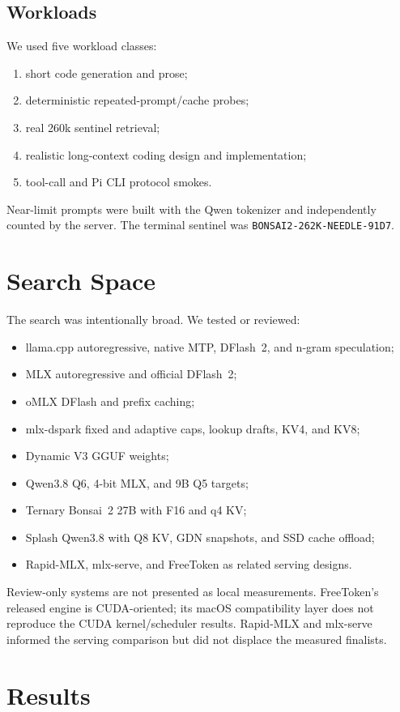 \documentclass[11pt]{article}
\begin{document}
\subsection{Workloads}
We used five workload classes:
\begin{enumerate}[leftmargin=1.6em]
\item short code generation and prose;
\item deterministic repeated-prompt/cache probes;
\item real 260k sentinel retrieval;
\item realistic long-context coding design and implementation;
\item tool-call and Pi CLI protocol smokes.
\end{enumerate}
Near-limit prompts were built with the Qwen tokenizer and independently counted by the server. The terminal sentinel was \texttt{BONSAI2-262K-NEEDLE-91D7}.

\section{Search Space}
The search was intentionally broad. We tested or reviewed:
\begin{itemize}[leftmargin=1.6em]
\item llama.cpp autoregressive, native MTP, DFlash~2, and n-gram speculation;
\item MLX autoregressive and official DFlash~2;
\item oMLX DFlash and prefix caching;
\item mlx-dspark fixed and adaptive caps, lookup drafts, KV4, and KV8;
\item Dynamic V3 GGUF weights;
\item Qwen3.8 Q6, 4-bit MLX, and 9B Q5 targets;
\item Ternary Bonsai~2 27B with F16 and q4 KV;
\item Splash Qwen3.8 with Q8 KV, GDN snapshots, and SSD cache offload;
\item Rapid-MLX, mlx-serve, and FreeToken as related serving designs.
\end{itemize}
Review-only systems are not presented as local measurements. FreeToken's released engine is CUDA-oriented; its macOS compatibility layer does not reproduce the CUDA kernel/scheduler results. Rapid-MLX and mlx-serve informed the serving comparison but did not displace the measured finalists.

\section{Results}
\end{document}
